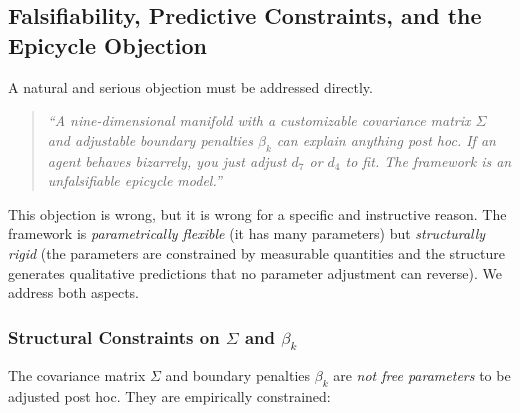 \documentclass[12pt]{article}
\theoremstyle{definition}
\theoremstyle{remark}
\begin{document}
\subsection{Falsifiability, Predictive Constraints, and the Epicycle Objection}
\label{sec:falsifiability}

A natural and serious objection must be addressed directly.

\begin{quote}
\emph{``A nine-dimensional manifold with a customizable covariance matrix $\Sigma$ and adjustable boundary penalties $\beta_k$ can explain anything post hoc.  If an agent behaves bizarrely, you just adjust $d_7$ or $d_4$ to fit.  The framework is an unfalsifiable epicycle model.''}
\end{quote}

This objection is wrong, but it is wrong for a specific and instructive reason.  The framework is \emph{parametrically flexible} (it has many parameters) but \emph{structurally rigid} (the parameters are constrained by measurable quantities and the structure generates qualitative predictions that no parameter adjustment can reverse).  We address both aspects.

\subsubsection{Structural Constraints on $\Sigma$ and $\beta_k$}

The covariance matrix $\Sigma$ and boundary penalties $\beta_k$ are \emph{not free parameters} to be adjusted post hoc.  They are empirically constrained:
\end{document}

